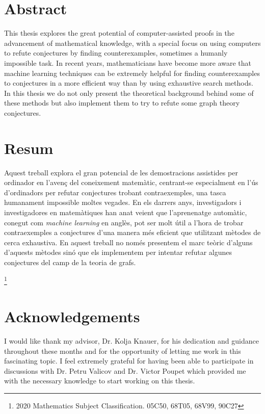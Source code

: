 \documentclass[11pt]{article}
\theoremstyle{definition}
\begin{document}
\setlength{\parindent}{0pt}

\newpage


\section*{Abstract}
This thesis explores the great potential of computer-assisted proofs in the advancement of mathematical knowledge, with a special focus on using computers to refute conjectures by finding counterexamples, sometimes a humanly impossible task. In recent years, mathematicians have become more aware that machine learning techniques can be extremely helpful for finding counterexamples to conjectures in a more efficient way than by using exhaustive search methods. In this thesis we do not only present the theoretical background behind some of these methods but also implement them to try to refute some graph theory conjectures.

\section*{Resum}
Aquest treball explora el gran potencial de les demostracions assistides per ordinador en l'avenç del coneixement matemàtic, centrant-se especialment en l'ús d'ordinadors per refutar conjectures trobant contraexemples, una tasca humanament impossible moltes vegades. En els darrers anys, investigadors i investigadores en matemàtiques han anat veient que l'aprenenatge automàtic, conegut com \textit{machine learning} en anglès, pot ser molt útil a l'hora de trobar contraexemples a conjectures d'una manera més eficient que utilitzant mètodes de cerca exhaustiva. En aquest treball no només presentem el marc teòric d'alguns d'aquests mètodes sinó que els implementem per intentar refutar algunes conjectures del camp de la teoria de grafs. 

{\let\thefootnote\relax\footnote{2020 Mathematics Subject Classification. 05C50, 68T05, 68V99, 90C27}} 

\newpage

\section*{Acknowledgements}
I would like thank my advisor, Dr. Kolja Knauer, for his dedication and guidance throughout these months and for the opportunity of letting me work in this fascinating topic. I feel extremely grateful for having been able to participate in discussions with Dr. Petru Valicov and Dr. Victor Poupet which provided me with the necessary knowledge to start working on this thesis.
\end{document}
